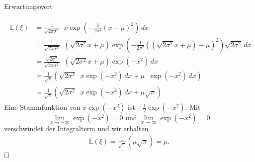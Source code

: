\documentclass[
  8pt,
  ignorenonframetext,
]{beamer}
\DeclareMathOperator*{\intinf}{\int_{-\infty}^{\infty}}
\begin{document}
\begin{frame}{Erwartungswert}
\protect\hypertarget{erwartungswert-3}{}
\footnotesize

\begin{align}
\begin{split}
\mathbb{E}(\xi)
& = \frac{1}{\sqrt{2\pi\sigma^2}}
\intinf x
\exp\left(-\frac{1}{2\sigma^2}(x - \mu)^2\right) \,dx \\
& = \frac{1}{\sqrt{2\pi\sigma^2}}
\intinf (\sqrt{2\sigma^2}x + \mu)
\exp\left(-\frac{1}{2\sigma^2}\left(\left(\sqrt{2\sigma^2}x + \mu \right) - \mu\right)^2\right)
\sqrt{2\sigma^2}\,dx \\
& = \frac{\sqrt{2\sigma^2}}{\sqrt{2\pi\sigma^2}}
\intinf (\sqrt{2\sigma^2}x + \mu)
\exp\left(-x^2\right) \,dx \\
& = \frac{1}{\sqrt{\pi}}
\left(\sqrt{2\sigma^2} \intinf x \exp\left(-x^2\right) \,dx
      + \mu \intinf \exp\left(-x^2\right) \,dx \right) \\
& = \frac{1}{\sqrt{\pi}}
\left(\sqrt{2\sigma^2} \intinf x \exp\left(-x^2\right) \,dx
      + \mu \sqrt{\pi} \right)
\end{split}
\end{align} Eine Stammfunktion von \(x \exp\left(-x^2\right)\) ist
\(-\frac{1}{2}\exp(-x^2)\). Mit \begin{equation}
\lim_{x \to -\infty} \exp(-x^2) = 0 \mbox{ und } \lim_{x \to \infty}\exp(-x^2) = 0
\end{equation} verschwindet der Integralterm und wir erhalten
\begin{align}
\mathbb{E}(\xi)
= \frac{1}{\sqrt{\pi}}\left(\mu \sqrt{\pi}\right)
= \mu.
\end{align} \(\hfill\Box\)
\end{frame}
\end{document}
